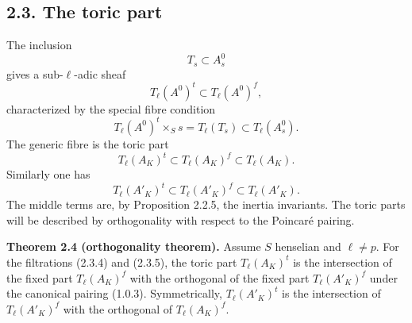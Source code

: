 \documentclass[11pt]{article}
\begin{document}
\subsection*{2.3. The toric part}
The inclusion
\begin{equation}\tag{2.3.1}
 T_s\subset A_s^0
\end{equation}
gives a sub-\(\ell\)-adic sheaf
\begin{equation}\tag{2.3.2}
 T_\ell(A^0)^t\subset T_\ell(A^0)^f,
\end{equation}
characterized by the special fibre condition
\begin{equation}\tag{2.3.3}
 T_\ell(A^0)^t\times_S s=T_\ell(T_s)\subset T_\ell(A_s^0).
\end{equation}
The generic fibre is the toric part
\begin{equation}\tag{2.3.4}
 T_\ell(A_K)^t\subset T_\ell(A_K)^f\subset T_\ell(A_K).
\end{equation}
Similarly one has
\begin{equation}\tag{2.3.5}
 T_\ell(A'_K)^t\subset T_\ell(A'_K)^f\subset T_\ell(A'_K).
\end{equation}
The middle terms are, by Proposition 2.2.5, the inertia invariants.  The toric parts will be described by orthogonality with respect to the Poincar\'e pairing.

\textbf{Theorem 2.4 (orthogonality theorem).}  Assume \(S\) henselian and \(\ell\ne p\).  For the filtrations (2.3.4) and (2.3.5), the toric part \(T_\ell(A_K)^t\) is the intersection of the fixed part \(T_\ell(A_K)^f\) with the orthogonal of the fixed part \(T_\ell(A'_K)^f\) under the canonical pairing (1.0.3).  Symmetrically, \(T_\ell(A'_K)^t\) is the intersection of \(T_\ell(A'_K)^f\) with the orthogonal of \(T_\ell(A_K)^f\).
\end{document}
